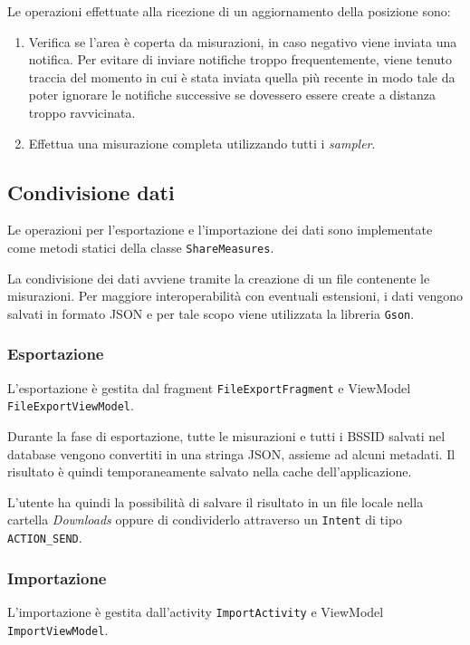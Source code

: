 \documentclass[11pt]{article}
\begin{document}
Le operazioni effettuate alla ricezione di un aggiornamento della posizione sono:
\begin{enumerate}
  \item Verifica se l'area è coperta da misurazioni, in caso negativo viene inviata una notifica.
        Per evitare di inviare notifiche troppo frequentemente, viene tenuto traccia del momento in cui è stata inviata quella più recente in modo tale da poter ignorare le notifiche successive se dovessero essere create a distanza troppo ravvicinata.
  \item Effettua una misurazione completa utilizzando tutti i \textit{sampler}.
\end{enumerate}



\subsection{Condivisione dati}

Le operazioni per l'esportazione e l'importazione dei dati sono implementate come metodi statici della classe \texttt{ShareMeasures}.

La condivisione dei dati avviene tramite la creazione di un file contenente le misurazioni.
Per maggiore interoperabilità con eventuali estensioni, i dati vengono salvati in formato JSON e per tale scopo viene utilizzata la libreria \texttt{Gson}.

\subsubsection{Esportazione}
L'esportazione è gestita dal fragment \texttt{FileExportFragment} e ViewModel \texttt{FileExportViewModel}.

Durante la fase di esportazione, tutte le misurazioni e tutti i BSSID salvati nel database vengono convertiti in una stringa JSON, assieme ad alcuni metadati. Il risultato è quindi temporaneamente salvato nella cache dell'applicazione.

L'utente ha quindi la possibilità di salvare il risultato in un file locale nella cartella \textit{Downloads} oppure di condividerlo attraverso un \texttt{Intent} di tipo \texttt{ACTION\_SEND}.


\subsubsection{Importazione}
L'importazione è gestita dall'activity \texttt{ImportActivity} e ViewModel \texttt{ImportViewModel}.
\end{document}
